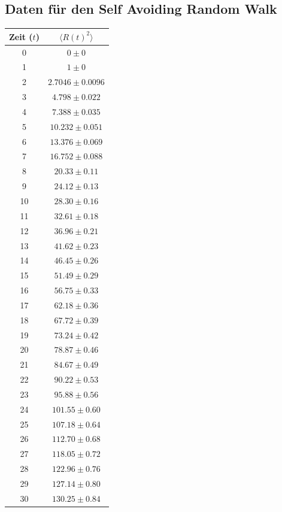 \documentclass[prb,12pt]{revtex4-2}
\theoremstyle{definition}
\theoremstyle{definition}
\begin{document}
\subsection{Daten für den Self Avoiding Random Walk}
\begin{longtable}{cc}
	\toprule
	Zeit ($t$) & $\langle R(t)^2 \rangle $\\\midrule
 0 & $0\pm 0$ \\\midrule
1 & $1\pm 0$ \\\midrule
2 & $2.7046\pm 0.0096$ \\\midrule
3 & $4.798\pm 0.022$ \\\midrule
4 & $7.388\pm 0.035$ \\\midrule
5 & $10.232\pm 0.051$ \\\midrule
6 & $13.376\pm 0.069$ \\\midrule
7 & $16.752\pm 0.088$ \\\midrule
8 & $20.33\pm 0.11$ \\\midrule
9 & $24.12\pm 0.13$ \\\midrule
10 & $28.30\pm 0.16$ \\\midrule
11 & $32.61\pm 0.18$ \\\midrule
12 & $36.96\pm 0.21$ \\\midrule
13 & $41.62\pm 0.23$ \\\midrule
14 & $46.45\pm 0.26$ \\\midrule
15 & $51.49\pm 0.29$ \\\midrule
16 & $56.75\pm 0.33$ \\\midrule
17 & $62.18\pm 0.36$ \\\midrule
18 & $67.72\pm 0.39$ \\\midrule
19 & $73.24\pm 0.42$ \\\midrule
20 & $78.87\pm 0.46$ \\\midrule
21 & $84.67\pm 0.49$ \\\midrule
22 & $90.22\pm 0.53$ \\\midrule
23 & $95.88\pm 0.56$ \\\midrule
24 & $101.55\pm 0.60$ \\\midrule
25 & $107.18\pm 0.64$ \\\midrule
26 & $112.70\pm 0.68$ \\\midrule
27 & $118.05\pm 0.72$ \\\midrule
28 & $122.96\pm 0.76$ \\\midrule
29 & $127.14\pm 0.80$ \\\midrule
30 & $130.25\pm 0.84$ \\\bottomrule
\end{longtable}
\end{document}
